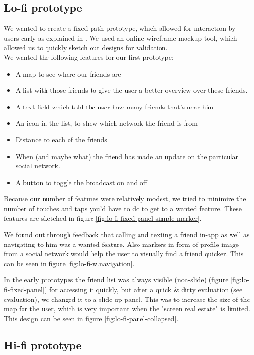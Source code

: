 \documentclass[runningheads,a4paper]{llncs}
\begin{document}
\subsection{Lo-fi prototype}
We wanted to create a fixed-path prototype, which allowed for interaction by users early as explained in \cite{prototyping}. We used an online wireframe mockup tool\cite{ninja}, which allowed us to quickly sketch out designs for validation. \\


We wanted the following features for our first prototype: 
\begin{itemize}
  \item A map to see where our friends are 
	\item A list with those friends to give the user a better overview over these friends. 
	\item A text-field which told the user how many friends that’s near him
	\item An icon in the list, to show which network the friend is from
	\item Distance to each of the friends
	\item When (and maybe what) the friend has made an update on the particular social network.
	\item A button to toggle the broadcast on and off\\ 
\end{itemize}

Because our number of features were relatively modest, we tried to minimize the number of touches and taps you'd have to do to get to a wanted feature. These features are sketched in figure \ref{fig:lo-fi-fixed-panel-simple-marker}.

We found out through feedback that calling and texting a friend in-app as well as navigating to him was a wanted feature. Also markers in form of profile image from a social network would help the user to visually find a friend quicker. This can be seen in figure \ref{fig:lo-fi-w.navigation}. 

In the early prototypes the friend list was always visible (non-slide) (figure \ref{fig:lo-fi-fixed-panel}) for accessing it quickly, but after a quick \& dirty evaluation (see evaluation), we changed it to a slide up panel. This was to increase the size of the map for the user, which is very important when the "screen real estate" is limited. This design can be seen in figure \ref{fig:lo-fi-panel-collapsed}.

\subsection{Hi-fi prototype}
\end{document}
